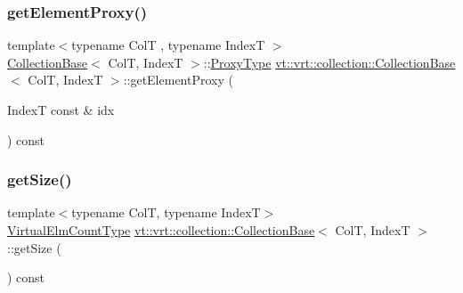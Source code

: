 \mbox{\label{structvt_1_1vrt_1_1collection_1_1_collection_base_acf2b3173e77b083920e3d4a06728e4c6}} 
\subsubsection{\texorpdfstring{get\+Element\+Proxy()}{getElementProxy()}}
{\footnotesize\ttfamily template$<$typename ColT , typename IndexT $>$ \\
\hyperlink{structvt_1_1vrt_1_1collection_1_1_collection_base}{Collection\+Base}$<$ ColT, IndexT $>$\+::\hyperlink{structvt_1_1vrt_1_1collection_1_1_collection_base_a0c2fd2443732bebc963f6278b7ba089b}{Proxy\+Type} \hyperlink{structvt_1_1vrt_1_1collection_1_1_collection_base}{vt\+::vrt\+::collection\+::\+Collection\+Base}$<$ ColT, IndexT $>$\+::get\+Element\+Proxy (\begin{DoxyParamCaption}\item[{IndexT const \&}]{idx }\end{DoxyParamCaption}) const}

\mbox{\label{structvt_1_1vrt_1_1collection_1_1_collection_base_a8a3b23d2d9512ec3d1a471028276e2d7}} 
\subsubsection{\texorpdfstring{get\+Size()}{getSize()}}
{\footnotesize\ttfamily template$<$typename ColT, typename IndexT$>$ \\
\hyperlink{namespacevt_ac115668758184050beff7a9281a2c490}{Virtual\+Elm\+Count\+Type} \hyperlink{structvt_1_1vrt_1_1collection_1_1_collection_base}{vt\+::vrt\+::collection\+::\+Collection\+Base}$<$ ColT, IndexT $>$\+::get\+Size (\begin{DoxyParamCaption}{ }\end{DoxyParamCaption}) const}

